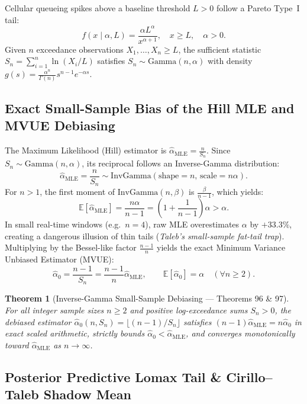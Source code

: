 \documentclass[11pt,a4paper]{article}
\newtheorem{theorem}{Theorem}[section]
\theoremstyle{definition}
\begin{document}
Cellular queueing spikes above a baseline threshold $L > 0$ follow a Pareto Type~I tail:
\[
  f(x \mid \alpha, L) = \frac{\alpha L^\alpha}{x^{\alpha + 1}}, \quad x \ge L, \quad \alpha > 0.
\]
Given $n$ exceedance observations $X_1, \dots, X_n \ge L$, the sufficient statistic $S_n = \sum_{i=1}^n \ln(X_i / L)$ satisfies $S_n \sim \mathrm{Gamma}(n, \alpha)$ with density $g(s) = \frac{\alpha^n}{\Gamma(n)} s^{n-1} e^{-\alpha s}$.

\subsection{Exact Small-Sample Bias of the Hill MLE and MVUE Debiasing}

The Maximum Likelihood (Hill) estimator is $\widehat{\alpha}_{\mathrm{MLE}} = \frac{n}{S_n}$. Since $S_n \sim \mathrm{Gamma}(n, \alpha)$, its reciprocal follows an Inverse-Gamma distribution:
\[
  \widehat{\alpha}_{\mathrm{MLE}} = \frac{n}{S_n} \sim \mathrm{InvGamma}(\text{shape}=n,\, \text{scale}=n\alpha).
\]
For $n > 1$, the first moment of $\mathrm{InvGamma}(n, \beta)$ is $\frac{\beta}{n-1}$, which yields:
\[
  \mathbb{E}[\widehat{\alpha}_{\mathrm{MLE}}] = \frac{n\alpha}{n - 1} = \left(1 + \frac{1}{n-1}\right)\alpha > \alpha.
\]
In small real-time windows (e.g.\ $n = 4$), raw MLE overestimates $\alpha$ by $+33.3\%$, creating a dangerous illusion of thin tails (\emph{Taleb's small-sample fat-tail trap}). Multiplying by the Bessel-like factor $\frac{n-1}{n}$ yields the exact Minimum Variance Unbiased Estimator (MVUE):
\[
  \widehat{\alpha}_0 = \frac{n - 1}{S_n} = \frac{n - 1}{n}\widehat{\alpha}_{\mathrm{MLE}}, \qquad \mathbb{E}[\widehat{\alpha}_0] = \alpha \quad (\forall n \ge 2).
\]

\begin{theorem}[Inverse-Gamma Small-Sample Debiasing --- Theorems 96 \& 97]
For all integer sample sizes $n \ge 2$ and positive log-exceedance sums $S_n > 0$, the debiased estimator $\widehat{\alpha}_0(n, S_n) = \lfloor (n-1)/S_n \rfloor$ satisfies $(n-1)\widehat{\alpha}_{\mathrm{MLE}} = n\widehat{\alpha}_0$ in exact scaled arithmetic, strictly bounds $\widehat{\alpha}_0 < \widehat{\alpha}_{\mathrm{MLE}}$, and converges monotonically toward $\widehat{\alpha}_{\mathrm{MLE}}$ as $n \to \infty$.
\end{theorem}

\subsection{Posterior Predictive Lomax Tail \& Cirillo--Taleb Shadow Mean}
\end{document}
